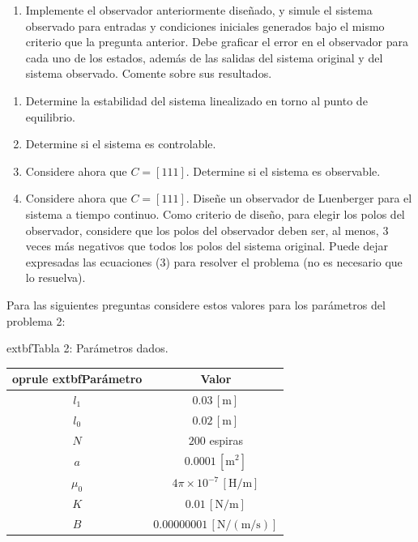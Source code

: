 \documentclass[
  11pt,
  letterpaper,
   addpoints,
   answers
  ]{exam}
\begin{document}
\begin{questions}
\begin{enumerate}
  \item Implemente el observador anteriormente diseñado, y simule el sistema observado para entradas y condiciones iniciales generados bajo el mismo criterio que la pregunta anterior. Debe graficar el error en el observador para cada uno de los estados, además de las salidas del sistema original y del sistema observado. Comente sobre sus resultados.
\end{enumerate}

\vspace{0.5cm}
\noindent{}

\begin{enumerate}
  \item Determine la estabilidad del sistema linealizado en torno al punto de equilibrio.

  \item Determine si el sistema es controlable.

  \item Considere ahora que $C = [111]$. Determine si el sistema es observable.

  \item Considere ahora que $C = [111]$. Diseñe un observador de Luenberger para el sistema a tiempo continuo. Como criterio de diseño, para elegir los polos del observador, considere que los polos del observador deben ser, al menos, 3 veces más negativos que todos los polos del sistema original. Puede dejar expresadas las ecuaciones (3) para resolver el problema (no es necesario que lo resuelva).
\end{enumerate}

\vspace{0.75cm}
\begin{center}
Para las siguientes preguntas considere estos valores para los parámetros del problema 2:

\medskip
	extbf{Tabla 2: Parámetros dados.}
\end{center}

\begin{table}[h!]
  \centering
  \begin{tabular}{@{}c c@{}}
    	oprule
    	extbf{Parámetro} & \textbf{Valor} \\
    \midrule
    $l_1$ & $0.03\,[\mathrm{m}]$ \\
    $l_0$ & $0.02\,[\mathrm{m}]$ \\
    $N$   & $200$ espiras \\
    $a$   & $0.0001\,[\mathrm{m}^2]$ \\
    $\mu_0$ & $4\pi \times 10^{-7}\,[\mathrm{H/m}]$ \\
    $K$   & $0.01\,[\mathrm{N/m}]$ \\
    $B$   & $0.00000001\,[\mathrm{N/(m/s)}]$ \\
    \bottomrule
  \end{tabular}
\end{table}
\end{questions}
\end{document}
